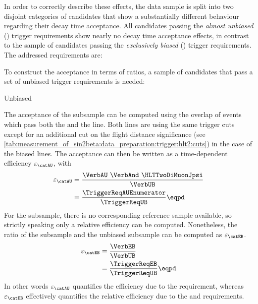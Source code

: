 In order to correctly describe these effects, the data sample is split into two
disjoint categories of candidates that show a substantially different behaviour
regarding their decay time acceptance. All candidates passing the \emph{almost
unbiased} (\textbf{\catAU}) trigger requirements show nearly no decay time
acceptance effects, in contrast to the sample of candidates passing the
\emph{exclusively biased} (\textbf{\catEB}) trigger requirements. The addressed
requirements are:
%
\begin{description}
  \item[\catAU] \TriggerReqAU
  \item[\catEB] \TriggerReqEB
\end{description}
%
To construct the acceptance in terms of ratios, a sample of candidates that pass
a set of unbiased trigger requirements is needed:
%
\begin{description}
  \item[Unbiased] \TriggerReqUB
\end{description}
%
The acceptance of the \catAU subsample can be computed using the overlap of events
which pass both the \HLTTwoDiMuonDetachedJpsi and the
\HLTTwoDiMuonJpsi line. Both lines are using the same trigger cuts except for
an additional cut on the flight distance significance (see
\cref{tab:measurement_of_sin2beta:data_preparation:trigger:hlt2:cuts}) in the
case of the biased lines. The acceptance can then be written as a time-dependent
efficiency $\varepsilon_\text{\catAU}$, with
%
\begin{align}
    \varepsilon_\text{\catAU} &= \frac{\text{\VerbAU \VerbAnd \HLTTwoDiMuonJpsi}}{\text{\VerbUB}}\\
                              &= \frac{\text{\TriggerReqAUEnumerator}}{\text{\TriggerReqUB}}\eqpd \nonumber
\end{align} 
%
For the \catEB subsample, there is no corresponding reference sample available,
so strictly speaking only a relative efficiency can be computed. Nonetheless,
the ratio of the \catEB subsample and the unbiased subsample can be computed as
$\varepsilon_\text{\catEB}$.
%
\begin{align}
    \varepsilon_\text{\catEB} &= \frac{\text{\VerbEB}}{\text{\VerbUB}}\\
                              &= \frac{\text{\TriggerReqEB}}{\text{\TriggerReqUB}}\eqpd \nonumber
\end{align}
%
In other words $\varepsilon_\text{\catAU}$ quantifies the efficiency due to the
\HLTTwoDiMuonDetachedJpsi requirement, whereas $\varepsilon_\text{\catEB}$
effectively quantifies the relative efficiency due to the \HLTOneTrackMuon and
\HLTTwoDiMuonDetachedJpsi requirements.

